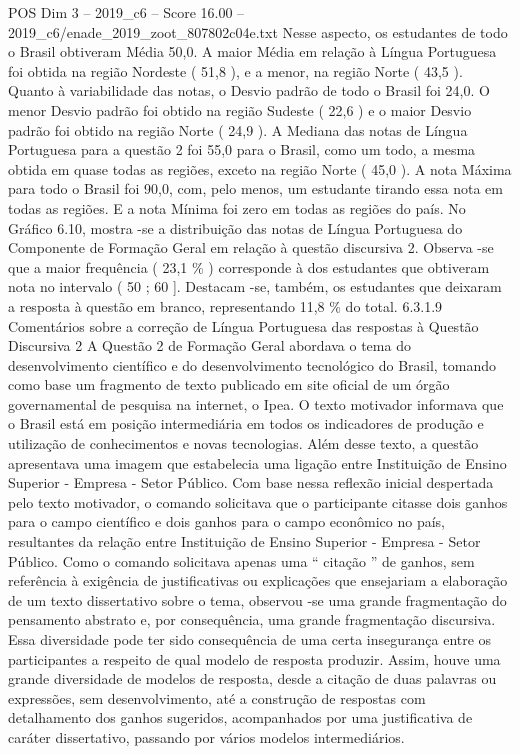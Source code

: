 \begin{textsample}{POS Dim 3 – 2019\_c6 – Score 16.00 – 2019\_c6/enade\_2019\_zoot\_807802c04e.txt}
Nesse aspecto, os estudantes de todo o Brasil obtiveram Média 50,0.
A maior Média em relação à Língua Portuguesa foi obtida na região Nordeste ( 51,8 ), e a menor, na região Norte ( 43,5 ).
Quanto à variabilidade das notas, o Desvio padrão de todo o Brasil foi 24,0.
O menor Desvio padrão foi obtido na região Sudeste ( 22,6 ) e o maior Desvio padrão foi obtido na região Norte ( 24,9 ).
A Mediana das notas de Língua Portuguesa para a questão 2 foi 55,0 para o Brasil, como um todo, a mesma obtida em quase todas as regiões, exceto na região Norte ( 45,0 ).
A nota Máxima para todo o Brasil foi 90,0, com, pelo menos, um estudante tirando essa nota em todas as regiões.
E a nota Mínima foi zero em todas as regiões do país.
No Gráfico 6.10, mostra -se a distribuição das notas de Língua Portuguesa do Componente de Formação Geral em relação à questão discursiva 2.
Observa -se que a maior frequência ( 23,1 \% ) corresponde à dos estudantes que obtiveram nota no intervalo ( 50 ; 60 ].
Destacam -se, também, os estudantes que deixaram a resposta à questão em branco, representando 11,8 \% do total. 6.3.1.9 Comentários sobre a correção de Língua Portuguesa das respostas à Questão Discursiva 2 A Questão 2 de Formação Geral abordava o tema do desenvolvimento científico e do desenvolvimento tecnológico do Brasil, tomando como base um fragmento de texto publicado em site oficial de um órgão governamental de pesquisa na internet, o Ipea.
O texto motivador informava que o Brasil está em posição intermediária em todos os indicadores de produção e utilização de conhecimentos e novas tecnologias.
Além desse texto, a questão apresentava uma imagem que estabelecia uma ligação entre Instituição de Ensino Superior - Empresa - Setor Público.
Com base nessa reflexão inicial despertada pelo texto motivador, o comando solicitava que o participante citasse dois ganhos para o campo científico e dois ganhos para o campo econômico no país, resultantes da relação entre Instituição de Ensino Superior - Empresa - Setor Público.
Como o comando solicitava apenas uma “ citação ” de ganhos, sem referência à exigência de justificativas ou explicações que ensejariam a elaboração de um texto dissertativo sobre o tema, observou -se uma grande fragmentação do pensamento abstrato e, por consequência, uma grande fragmentação discursiva.
Essa diversidade pode ter sido consequência de uma certa insegurança entre os participantes a respeito de qual modelo de resposta produzir.
Assim, houve uma grande diversidade de modelos de resposta, desde a citação de duas palavras ou expressões, sem desenvolvimento, até a construção de respostas com detalhamento dos ganhos sugeridos, acompanhados por uma justificativa de caráter dissertativo, passando por vários modelos intermediários.

\end{textsample}
